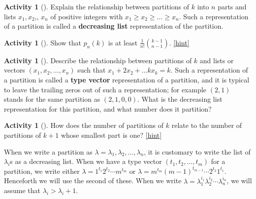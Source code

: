 \documentclass[10pt,]{book}
\newcommand{\terminology}[1]{\textbf{#1}}
\theoremstyle{plain}
\theoremstyle{definition}
\theoremstyle{definition}
\theoremstyle{definition}
\newtheorem{activity}[project]{Activity}
\numberwithin{equation}{chapter}
\begin{document}
\begin{activity}[]\label{activity-203}
\hypertarget{p-1128}{}%
Explain the relationship between partitions of \(k\) into \(n\) parts and lists \(x_1,x_2\),\textellipsis{}, \(x_n\) of positive integers with \(x_1\ge x_2\ge\ldots \ge x_n\). Such a representation of a partition is called a \terminology{decreasing list} representation of the partition.%
\end{activity}
\begin{activity}[]\label{activity-204}
\hypertarget{p-1130}{}%
Show that \(p_n(k)\) is at least \(\frac{1}{n!}\binom{k-1}{n-1}\).%
\hfill{\tiny\hyperlink{a-211}{[hint]}\hypertarget{q-211}{}}\end{activity}
\begin{activity}[]\label{activity-205}
\hypertarget{p-1133}{}%
Describe the relationship between partitions of \(k\) and lists or vectors \((x_1,x_2,\ldots,x_n)\) such that \(x_1+2x_2+\ldots kx_k = k\).  Such a representation of a partition is called a \terminology{type vector} representation of a partition, and it is typical to leave the trailing zeros out of such a representation; for example \((2,1)\) stands for the same partition as \((2,1,0,0)\). What is the decreasing list representation for this partition, and what number does it partition?%
\end{activity}
\begin{activity}[]\label{activity-206}
\hypertarget{p-1135}{}%
How does the number of partitions of \(k\) relate to the number of partitions of \(k+1\) whose smallest part is one?%
\hfill{\tiny\hyperlink{a-213}{[hint]}\hypertarget{q-213}{}}\end{activity}
\hypertarget{p-1138}{}%
When we write a partition as \(\lambda = \lambda_1,\lambda_2,\ldots,\lambda_n\), it is customary to write the list of \(\lambda_i\)s as a decreasing list. When we have a type vector \((t_1,t_2,\ldots,t_m)\) for a partition, we write either \(\lambda = 1^{t_1}2^{t_2}\cdots m^{t_m}\) or \(\lambda = m^{t_m}(m-1)^{t_{m-1}}\cdots 2^{t_2}1^{t_1}\). Henceforth we will use the second of these. When we write \(\lambda=\lambda_1^{i_1}\lambda_2^{i_2}\cdots\lambda_n^{i_n}\), we will assume that \(\lambda_i>\lambda_i+1\).%
\par
\hypertarget{p-1139}{}%
\end{document}

